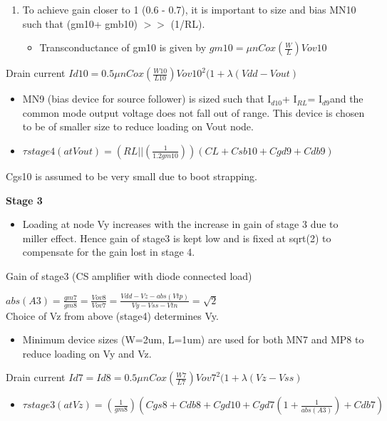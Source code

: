 \documentclass[12pt,a4paper]{article}
\begin{document}
\begin{enumerate}
\item To achieve gain closer to 1 (0.6 - 0.7), it is important to size 
and bias MN10 such that (gm10+ gmb10) $>$$>$ (1/RL). 
\begin{itemize}
\item Transconductance of gm10 is given by $gm10= \mu 
nCox(\frac{W}{L})Vov10$
\end{itemize}
\end{enumerate}
Drain current $Id10=0.5\mu nCox(\frac{W10}{L10})Vov10^{2} (1+\lambda 
(Vdd-Vout)$

\begin{itemize}
\item MN9 (bias device for source follower) is sized such that I$_{d10 
}$+ I$_{RL }$= I$_{d9 }$and the common mode output voltage does 
not fall out of range. This device is chosen to be of smaller size to 
reduce loading on Vout node. 
\item $\tau stage4 (at Vout)=(RL || 
(\frac{1}{1.2gm10}))(CL+Csb10+Cgd9+Cdb9)$
\end{itemize}
Cgs10 is assumed to be very small due to boot strapping.



\textbf{Stage 3}



\begin{itemize}
\item Loading at node Vy increases with the increase in gain of stage 3 
due to miller effect. Hence gain of stage3 is kept low and is fixed at 
sqrt(2) to compensate for the gain lost in stage 4. 
\end{itemize}
Gain of stage3 (CS amplifier with diode connected load)



$
abs(A3)=\frac{gm7}{gm8}=\frac{Vov8}{Vov7}=\frac{Vdd-Vz-abs(Vtp)}{Vy-Vss-Vtn}= 
\sqrt{2}$\\


 

Choice of Vz from above (stage4) determines Vy.

\begin{itemize}
\item Minimum device sizes (W=2um, L=1um) are used for both MN7 and MP8 
to reduce loading on Vy and Vz.
\end{itemize}
Drain current $Id7=Id8=0.5\mu nCox(\frac{W7}{L7})Vov7^{2} (1+\lambda 
(Vz-Vss)$

\begin{itemize}
\item $\tau stage3 (at Vz)=(\frac{1}{gm8})(Cgs8+Cdb8+Cgd10+Cgd7 
(1+\frac{1}{abs(A3)})+Cdb7)$
\end{itemize}
\end{document}
